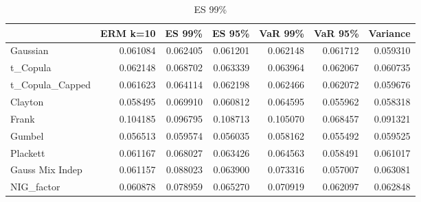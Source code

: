 \begin{table}
        \centering
\begin{tabular}{lrrrrrr}
\toprule
{} &  ERM k=10 &    ES 99\% &    ES 95\% &   VaR 99\% &   VaR 95\% &  Variance \\
\midrule
Gaussian        &  0.061084 &  0.062405 &  0.061201 &  0.062148 &  0.061712 &  \color{blue}0.059310 \\
t\_Copula        &  0.062148 &  0.068702 &  0.063339 &  0.063964 &  0.062067 & \color{blue}0.060735 \\
t\_Copula\_Capped &  0.061623 &  0.064114 &  0.062198 &  0.062466 &  0.062072 & \color{blue}0.059676 \\
Clayton         &  0.058495 &  0.069910 &  0.060812 &  0.064595 &  \color{blue}0.055962 &  \color{green}0.058318 \\
Frank           &  0.104185 &  0.096795 &  0.108713 &  0.105070 &  \color{blue}0.068457 &  0.091321 \\
Gumbel          &  \color{green}0.056513 &  \color{green}0.059574 &  \color{green}0.056035 &  \color{green}0.058162 &  \color{red}0.055492 &  0.059525 \\
Plackett        &  0.061167 &  0.068027 &  0.063426 &  0.064563 &  \color{blue}0.058491 &  0.061017 \\
Gauss Mix Indep &  0.061157 &  0.088023 &  0.063900 &  0.073316 &  \color{blue}0.057007 &  0.063081 \\
NIG\_factor      &  \color{blue}0.060878 &  0.078959 &  0.065270 &  0.070919 &  0.062097 &  0.062848 \\
\bottomrule
\end{tabular}
\caption{ES 99\%}
\end{table}

